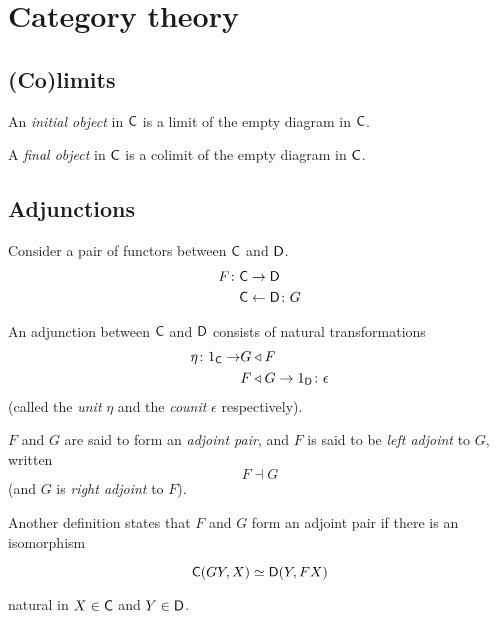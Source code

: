\chapter{Category theory}

\section{(Co)limits}

\begin{definition}
  An \emph{initial object} in $\mathsf{C}$ is a limit of the empty diagram in $\mathsf{C}$.
\end{definition}

\begin{definition}
  A \emph{final object} in $\mathsf{C}$ is a colimit of the empty diagram in $\mathsf{C}$.
\end{definition}

\section{Adjunctions}

Consider a pair of functors between $\mathsf{C}$ and $\mathsf{D}$.
\begin{align*}
  F \colon &\mathsf{C} \to        \mathsf{D}\\
           &\mathsf{C} \leftarrow \mathsf{D} \colon G
\end{align*}

\begin{definition}
  An adjunction between $\mathsf{C}$ and $\mathsf{D}$ consists of natural transformations
  \begin{align*}
    \eta \colon 1_{\mathsf{C}} \to &G\triangleleft F\\
                          &F\triangleleft G \to 1_{\mathsf{D}} \colon \epsilon
  \end{align*}
  (called the \emph{unit} $\eta$ and the \emph{counit} $\epsilon$ respectively).
\end{definition}

$F$ and $G$ are said to form an \emph{adjoint pair}, and $F$ is said to be
\emph{left adjoint} to $G$, written
\[ F\dashv G \]
(and $G$ is \emph{right adjoint} to $F$).

\begin{definition}
  Another definition states that $F$ and $G$ form an adjoint pair if there is an
  isomorphism

  \[ \mathsf{C}(GY, X) \simeq \mathsf{D}(Y, FX) \]

  natural in $X\in\mathsf{C}$ and $Y\in\mathsf{D}$.
\end{definition}
